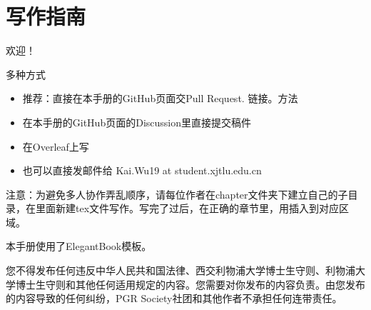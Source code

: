 \chapter{写作指南}

欢迎！

多种方式
\begin{itemize}
    \item 推荐：直接在本手册的GitHub页面交Pull Request. 链接。方法
    \item 在本手册的GitHub页面的Discussion里直接提交稿件
    \item 在Overleaf上写
    \item 也可以直接发邮件给 Kai.Wu19 at student.xjtlu.edu.cn
\end{itemize}

注意：为避免多人协作弄乱顺序，请每位作者在chapter文件夹下建立自己的子目录，在里面新建tex文件写作。写完了过后，在正确的章节里，用\lstinline{}插入到对应区域。


本手册使用了ElegantBook模板。

您不得发布任何违反中华人民共和国法律、西交利物浦大学博士生守则、利物浦大学博士生守则和其他任何适用规定的内容。您需要对你发布的内容负责。由您发布的内容导致的任何纠纷，PGR Society社团和其他作者不承担任何连带责任。
